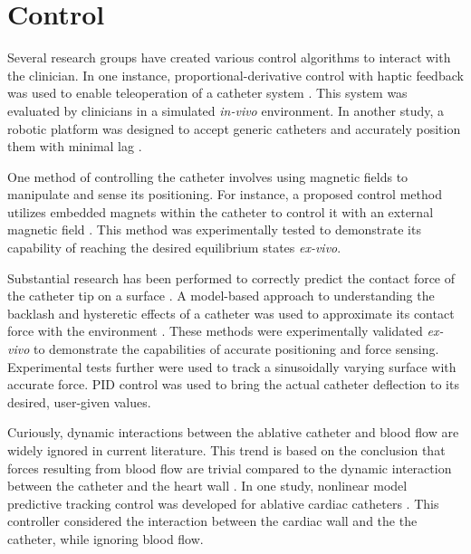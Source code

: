 \documentclass[letterpaper,10pt,conference]{ieeeconf}   %
\begin{document}
\section{Control}
\label{sec:Control}

Several research groups have created various control algorithms to interact with the clinician. In one instance, proportional-derivative control with haptic feedback was used to enable teleoperation of a catheter system \cite{srimathveeravalli:10a}. This system was evaluated by clinicians in a simulated \textit{in-vivo} environment. In another study, a robotic platform was designed to accept generic catheters and accurately position them with minimal lag \cite{thakur:09a}. 

One method of controlling the catheter involves using magnetic fields to manipulate and sense its positioning. For instance, a proposed control method utilizes embedded magnets within the catheter to control it with an external magnetic field \cite{le:16a}. This method was experimentally tested to demonstrate its capability of reaching the desired equilibrium states \textit{ex-vivo}. 

Substantial research has been performed to correctly predict the contact force of the catheter tip on a surface \cite{natale:14a}. A model-based approach to understanding the backlash and hysteretic effects of a catheter was used to approximate its contact force with the environment \cite{khoshnam:14a}. These methods were experimentally validated \textit{ex-vivo} to demonstrate the capabilities of accurate positioning and force sensing. Experimental tests further were used to track a sinusoidally varying surface with accurate force. PID control was used to bring the actual catheter deflection to its desired, user-given values.

Curiously, dynamic interactions between the ablative catheter and blood flow are widely ignored in current literature. This trend is based on the conclusion that forces resulting from blood flow are trivial compared to the dynamic interaction between the catheter and the heart wall \cite{salimi:11a}. In one study, nonlinear model predictive tracking control was developed for ablative cardiac catheters \cite{soltani:17a}. This controller considered the interaction between the cardiac wall and the the catheter, while ignoring blood flow.

\end{document}
